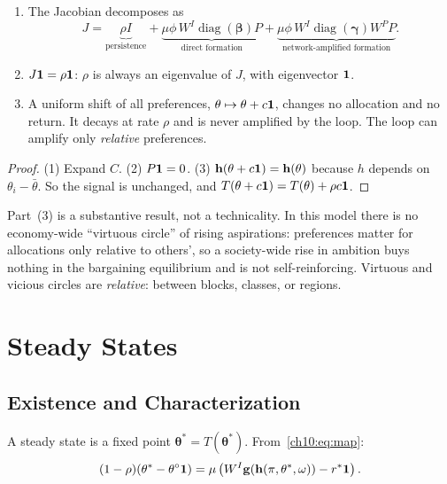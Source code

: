 \documentclass[../structural_economics_book.tex]{subfiles}
\begin{document}
\begin{proposition}\label{ch10:prop:jacobian}
\begin{enumerate}
\item The Jacobian decomposes as
\[
J = \underbrace{\rho I}_{\text{persistence}} + \underbrace{\mu\phi\, W^I \operatorname{diag}(\boldsymbol{\beta}) P}_{\text{direct formation}} + \underbrace{\mu\phi\, W^I \operatorname{diag}(\boldsymbol{\gamma}) W^P P}_{\text{network-amplified formation}}.
\]
\item $J\mathbf{1} = \rho\mathbf{1}$: $\rho$ is always an eigenvalue of $J$, with eigenvector $\mathbf{1}$.
\item A uniform shift of all preferences, $\theta \mapsto \theta + c\mathbf{1}$, changes no allocation and no return. It decays at rate $\rho$ and is never amplified by the loop. The loop can amplify only \textit{relative} preferences.
\end{enumerate}
\end{proposition}

\begin{proof}
(1) Expand $C$. (2) $P\mathbf{1} = 0$. (3) $\mathbf{h}(\theta + c\mathbf{1}) = \mathbf{h}(\theta)$ because $h$ depends on $\theta_i - \bar{\theta}$. So the signal is unchanged, and $T(\theta + c\mathbf{1}) = T(\theta) + \rho c\mathbf{1}$.
\end{proof}

Part~(3) is a substantive result, not a technicality. In this model there is no economy-wide ``virtuous circle'' of rising aspirations: preferences matter for allocations only relative to others', so a society-wide rise in ambition buys nothing in the bargaining equilibrium and is not self-reinforcing. Virtuous and vicious circles are \textit{relative}: between blocks, classes, or regions.


\section{Steady States}
\label{ch10:sec:steady}

\subsection{Existence and Characterization}

A steady state is a fixed point $\boldsymbol{\theta}^* = T(\boldsymbol{\theta}^*)$. From~\eqref{ch10:eq:map}:
\begin{equation}\label{ch10:eq:steady_state}
(1 - \rho)(\theta^* - \theta^{\circ}\mathbf{1}) = \mu\left(W^I\mathbf{g}(\mathbf{h}(\pi, \theta^*, \omega)) - r^*\mathbf{1}\right).
\end{equation}
\end{document}
